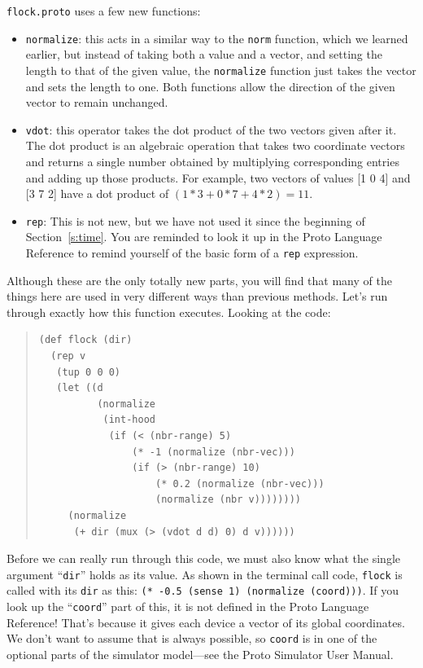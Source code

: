 \documentclass{article}
\newcommand\var[1]{{\tt #1}}
\newcommand\qvar[1]{``{\tt #1}''}
\begin{document}
\var{flock.proto} uses a few new functions:
\begin{itemize}
\item \var{normalize}: this acts in a similar way to the \var{norm}
  function, which we learned earlier, but instead of taking both a
  value and a vector, and setting the length to that of the given
  value, the \var{normalize} function just takes the vector and sets
  the length to one.  Both functions allow the direction of the
  given vector to remain unchanged.
\item \var{vdot}: this operator takes the dot product of the two
  vectors given after it.  The dot product is an algebraic operation
  that takes two coordinate vectors and returns a single number
  obtained by multiplying corresponding entries and adding up those
  products.  For example, two vectors of values [1 0 4] and [3 7 2]
  have a dot product of $(1 * 3 + 0 * 7 + 4 * 2) = 11$.
\item \var{rep}: This is not new, but we have not used it since the
  beginning of Section~\ref{s:time}.  You are reminded to look it up
  in the Proto Language Reference to remind yourself of the
  basic form of a \var{rep} expression.
\end{itemize}

Although these are the only totally new parts, you will find that many
of the things here are used in very different ways than previous
methods.  Let's run through exactly how this function executes.  Looking
at the code:
	
\begin{quote}
\begin{verbatim}
(def flock (dir)
  (rep v
   (tup 0 0 0)
   (let ((d
          (normalize
           (int-hood
            (if (< (nbr-range) 5)
                (* -1 (normalize (nbr-vec)))
                (if (> (nbr-range) 10)
                    (* 0.2 (normalize (nbr-vec)))
                    (normalize (nbr v))))))))
     (normalize
      (+ dir (mux (> (vdot d d) 0) d v))))))
\end{verbatim}
\end{quote}

Before we can really run through this code, we must also know what the
single argument \qvar{dir} holds as its value.  As shown in the
terminal call code, \var{flock} is called with its \var{dir} as this:
\var{(* -0.5 (sense 1) (normalize (coord)))}.  If you look up the
\qvar{coord} part of this, it is not defined in the Proto Language
Reference!  That's because it gives each device a vector of its global
coordinates.  We don't want to assume that is always possible, so
\var{coord} is in one of the optional parts of the simulator
model---see the Proto Simulator User Manual.
\end{document}
